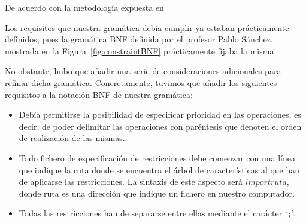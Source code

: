 

De acuerdo con la metodología expuesta en 


Los requisitos que nuestra gramática debía cumplir ya estaban prácticamente definidos, pues la gramática BNF definida por el profesor Pablo Sánchez, mostrada en la Figura~\ref{fig:constraintBNF} prácticamente fijaba la misma.

No obstante, hubo que añadir una serie de consideraciones adicionales para refinar dicha gramática. Concretamente, tuvimos que añadir los siguientes requisitos a la notación BNF de nuestra gramática:

\begin{itemize}
    \item Debía permitirse la posibilidad de especificar prioridad en las operaciones, es decir, de poder delimitar las operaciones con paréntesis que denoten el orden de realización de las mismas.
    \item Todo fichero de especificación de restricciones debe comenzar con una línea que indique la ruta donde se encuentra el árbol de características al que han de aplicarse las restricciones. La sintaxis de este aspecto será $import ruta$, donde ruta es una dirección que indique un fichero en nuestro computador.
    \item Todas las restricciones han de separarse entre ellas mediante el carácter `\texttt{;}'.
\end{itemize}

